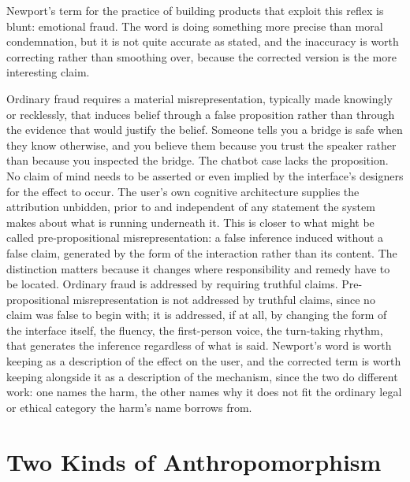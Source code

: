 \documentclass[11pt]{article}
\begin{document}
Newport's term for the practice of building products that exploit this reflex is blunt: emotional fraud. The word is doing something more precise than moral condemnation, but it is not quite accurate as stated, and the inaccuracy is worth correcting rather than smoothing over, because the corrected version is the more interesting claim.

Ordinary fraud requires a material misrepresentation, typically made knowingly or recklessly, that induces belief through a false proposition rather than through the evidence that would justify the belief. Someone tells you a bridge is safe when they know otherwise, and you believe them because you trust the speaker rather than because you inspected the bridge. The chatbot case lacks the proposition. No claim of mind needs to be asserted or even implied by the interface's designers for the effect to occur. The user's own cognitive architecture supplies the attribution unbidden, prior to and independent of any statement the system makes about what is running underneath it. This is closer to what might be called pre-propositional misrepresentation: a false inference induced without a false claim, generated by the form of the interaction rather than its content. The distinction matters because it changes where responsibility and remedy have to be located. Ordinary fraud is addressed by requiring truthful claims. Pre-propositional misrepresentation is not addressed by truthful claims, since no claim was false to begin with; it is addressed, if at all, by changing the form of the interface itself, the fluency, the first-person voice, the turn-taking rhythm, that generates the inference regardless of what is said. Newport's word is worth keeping as a description of the effect on the user, and the corrected term is worth keeping alongside it as a description of the mechanism, since the two do different work: one names the harm, the other names why it does not fit the ordinary legal or ethical category the harm's name borrows from.

\section{Two Kinds of Anthropomorphism}
\label{sec:twokinds}
\end{document}

